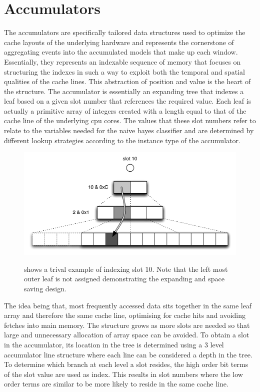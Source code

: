\documentclass[a4paper,11pt]{scrreprt}
\begin{document}
\section{Accumulators}
The accumulators are specifically tailored data structures used to optimize the cache layouts of the underlying hardware and represents the cornerstone of aggregating events into the accumulated models that make up each window. Essentially, they represents an indexable sequence of memory that focuses on structuring the indexes in such a way to exploit both the temporal and spatial qualities of the cache lines. This abstraction of position and value is the heart of the structure. The accumulator is essentially an expanding tree that indexes a leaf based on a given slot number that references the required value. Each leaf is actually a primitive array of integers created with a length equal to that of the cache line of the underlying \acrshort{cpu} cores. The values that these slot numbers refer to relate to the variables needed for the naive bayes classifier and are determined by different lookup strategies according to the instance type of the accumulator. \\
\begin{figure}[h!]
\centering
\caption{shows a trival example of indexing slot 10. Note that the left most outer leaf is not assigned demonstrating the expanding and space saving design.}
\includegraphics[scale=0.72, trim=0 0 0 12, clip=true] {accumulator-lookup.pdf}
\label{fig:accumulator-lookup}
\end{figure}

The idea being that, most frequently accessed data sits together in the same leaf array and therefore the same cache line, optimising for cache hits and avoiding fetches into main memory. The structure grows as more slots are needed so that large and unnecessary allocation of array space can be avoided. To obtain a slot in the accumulator, its location in the tree is determined using a 3 level accumulator line structure where each line can be considered a depth in the tree. To determine which branch at each level a slot resides, the high order bit terms of the slot value are used as index. This results in slot numbers where the low order terms are similar to be more likely to reside in the same cache line.
\end{document}
